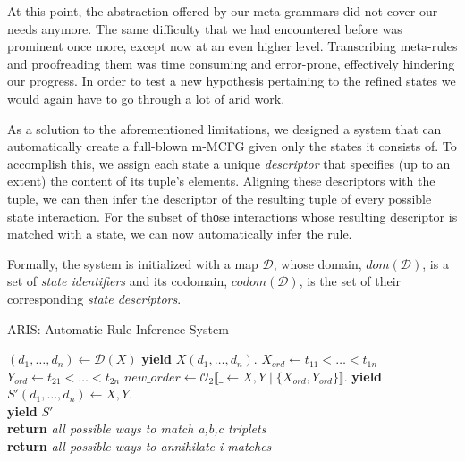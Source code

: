 \documentclass[nonatbib,numbers,10pt]{llncs}
\newcommand{\Orderr}[5]{
	\mathcal{#1}_{#5}\llbracket #2 \leftarrow #3 \mid \{ #4 \} \rrbracket.
}
\newcommand{\Or}[4]{\Orderr{O}{#1}{#2}{#3}{#4}}
\begin{document}
At this point, the abstraction offered by our meta-grammars did not cover our needs anymore. The same difficulty that we had encountered before was prominent once more, except now at an even higher level. Transcribing meta-rules and proofreading them was time consuming and error-prone, effectively hindering our progress. In order to test a new hypothesis pertaining to the refined states we would again have to go through a lot of arid work.

As a solution to the aforementioned limitations, we designed a system that can automatically create a full-blown m-MCFG given only the states it consists of. To accomplish this, we assign each state a unique \textit{descriptor} that specifies (up to an extent) the content of its tuple's elements. Aligning these descriptors with the tuple, we can then infer the descriptor of the resulting tuple of every possible state interaction. For the subset of thοse interactions whose resulting descriptor is matched with a state, we can now automatically infer the rule.

Formally, the system is initialized with a map $\mathcal{D}$, whose domain, $dom(\mathcal{D})$, is a set of \textit{state identifiers} and its codomain, $codom(\mathcal{D})$, is the set of their corresponding \textit{state descriptors}.

\begin{algorithm}
\caption{ARIS: Automatic Rule Inference System}\label{euclid}
\begin{algorithmic}
		\State $(d_1,\dots ,d_n) \leftarrow \mathcal{D}(X)$
		\State \textbf{yield} $X(d_1,\dots,d_n).$
	\EndFor
		\State $X_{ord} \leftarrow t_{11}<\dots<t_{1n}$ 
		\State $Y_{ord} \leftarrow t_{21}<\dots<t_{2n}$ 
		\State $new\_order \leftarrow \Or{\_}{X,Y}{X_{ord}, Y_{ord}}{2}$
				\State \textbf{yield} $S'(d_1,\dots ,d_n) \leftarrow X, Y.$
			\EndFor
		\EndFor
	\EndFor
\EndProcedure
\\
					\State \textbf{yield} $S'$
				\EndIf				
			\EndFor
		\EndFor
	\EndFor
\EndProcedure
\\
	\State \textbf{return} \textit{all possible ways to match a,b,c triplets}
\EndProcedure
\\
	\State \textbf{return} \textit{all possible ways to annihilate i matches}
\EndProcedure
\end{algorithmic}
\end{algorithm}
\end{document}
